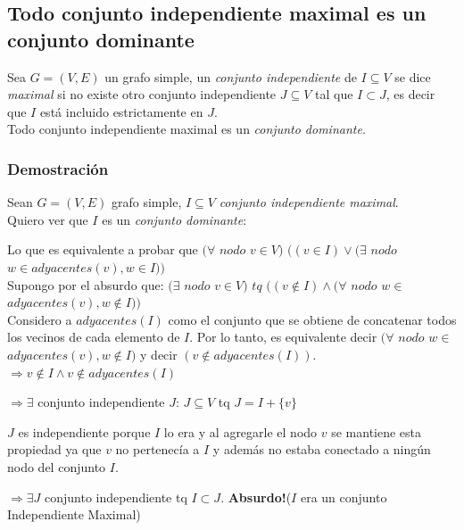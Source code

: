 \subsection{Todo conjunto independiente maximal es un conjunto dominante}

 Sea $G = (V, E)$ un grafo simple, un \emph{conjunto independiente} de $I \subseteq V$ se dice \emph{maximal} si no existe otro conjunto independiente $J \subseteq V$ tal que $I \subset J$, es decir que $I$ est\'a incluido estrictamente en $J$. \\
 
 Todo conjunto independiente maximal es un \emph{conjunto dominante}.
 
\subsubsection*{Demostraci\'on}

Sean $G = (V, E)$ grafo simple, $I \subseteq V$ \emph{conjunto independiente maximal}.\\

Quiero ver que $I$ es un \emph{conjunto dominante}: 

Lo que es equivalente a probar que $(\forall $ $nodo$ $ v \in V)$ $((v \in I) \vee (\exists $ $nodo$ $ w \in adyacentes(v), w \in I))$\\

\bigskip
Supongo por el absurdo que: 
$(\exists $ $nodo$ $ v \in V)$ $tq$ $((v\notin I)\wedge(\forall $ $nodo$ $w \in $ $adyacentes(v), w\notin I))$\\

Considero a $adyacentes(I)$ como el conjunto que se obtiene de concatenar todos los vecinos de cada elemento de $I$. Por lo tanto, es equivalente decir $(\forall $ $nodo$ $w \in $ $adyacentes(v), w\notin I)$ y decir $( v \notin adyacentes(I))$.\\

$\Rightarrow v\notin I \wedge v \notin adyacentes(I)$ 

$\Rightarrow \exists$ conjunto independiente $J$: $J\subseteq V$ tq $J=I+\{v\}$

$J$ es independiente porque $I$ lo era y al agregarle el nodo $v$ se mantiene esta propiedad ya que $v$ no pertenec\'ia a $I$ y adem\'as no estaba conectado a ning\'un nodo del conjunto $I$.

$\Rightarrow \exists J$ conjunto independiente tq $I \subset J$. \textbf{Absurdo!}($I$ era un conjunto Independiente Maximal)\\

